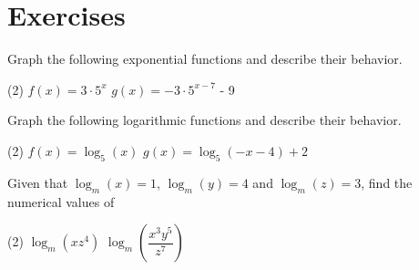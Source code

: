 \section{\large Exercises}


\begin{exer}
    Graph the following exponential functions and describe their behavior.
    \begin{tasks}(2)
        \task $f(x) = 3\cdot 5^x$
        \task $g(x) = -3\cdot 5^{x - 7}$ - 9
    \end{tasks}
\end{exer}

\begin{exer}
    Graph the following logarithmic functions and describe their behavior.
    \begin{tasks}(2)
        \task $f(x) = \log_5 (x)$
        \task $g(x) = \log_5 (-x - 4) + 2$
    \end{tasks}
\end{exer}

\begin{exer}
    Given that $\log_m (x) = 1$, $\log_m (y) = 4$ and $\log_m (z) = 3$, find the numerical values of
    \begin{tasks}(2)
        \task $\log_m (x z^4)$
        \task $\log_m \left(\dfrac{x^3 y^5}{z^7}\right)$
    \end{tasks}
\end{exer}